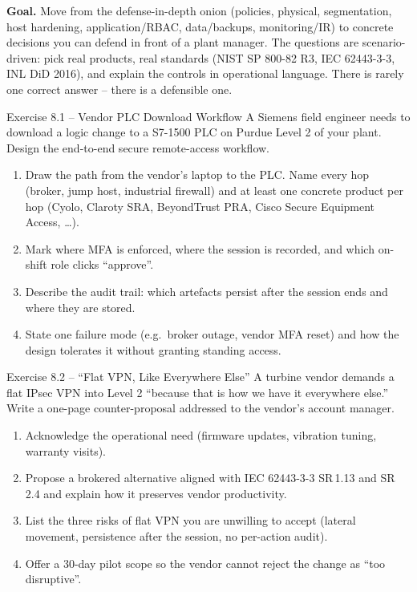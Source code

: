 \documentclass[11pt,a4paper]{article}
\begin{document}
\sheetheader

\noindent\textbf{Goal.} Move from the defense-in-depth onion (policies, physical, segmentation, host hardening, application/RBAC, data/backups, monitoring/IR) to concrete decisions you can defend in front of a plant manager. The questions are scenario-driven: pick real products, real standards (NIST SP 800-82 R3, IEC 62443-3-3, INL DiD 2016), and explain the controls in operational language. There is rarely one correct answer -- there is a defensible one.

\vspace{0.6em}

\begin{taskbox}{Exercise 8.1 -- Vendor PLC Download Workflow}
A Siemens field engineer needs to download a logic change to a S7-1500 PLC on Purdue Level 2 of your plant. Design the end-to-end secure remote-access workflow.
\begin{enumerate}\setlength{\itemsep}{1pt}
  \item Draw the path from the vendor's laptop to the PLC. Name every hop (broker, jump host, industrial firewall) and at least one concrete product per hop (Cyolo, Claroty SRA, BeyondTrust PRA, Cisco Secure Equipment Access, \ldots).
  \item Mark where MFA is enforced, where the session is recorded, and which on-shift role clicks ``approve''.
  \item Describe the audit trail: which artefacts persist after the session ends and where they are stored.
  \item State one failure mode (e.g.\ broker outage, vendor MFA reset) and how the design tolerates it without granting standing access.
\end{enumerate}
\end{taskbox}

\begin{taskbox}{Exercise 8.2 -- ``Flat VPN, Like Everywhere Else''}
A turbine vendor demands a flat IPsec VPN into Level 2 ``because that is how we have it everywhere else.'' Write a one-page counter-proposal addressed to the vendor's account manager.
\begin{enumerate}\setlength{\itemsep}{1pt}
  \item Acknowledge the operational need (firmware updates, vibration tuning, warranty visits).
  \item Propose a brokered alternative aligned with IEC 62443-3-3 SR\,1.13 and SR\,2.4 and explain how it preserves vendor productivity.
  \item List the three risks of flat VPN you are unwilling to accept (lateral movement, persistence after the session, no per-action audit).
  \item Offer a 30-day pilot scope so the vendor cannot reject the change as ``too disruptive''.
\end{enumerate}
\end{taskbox}
\end{document}
